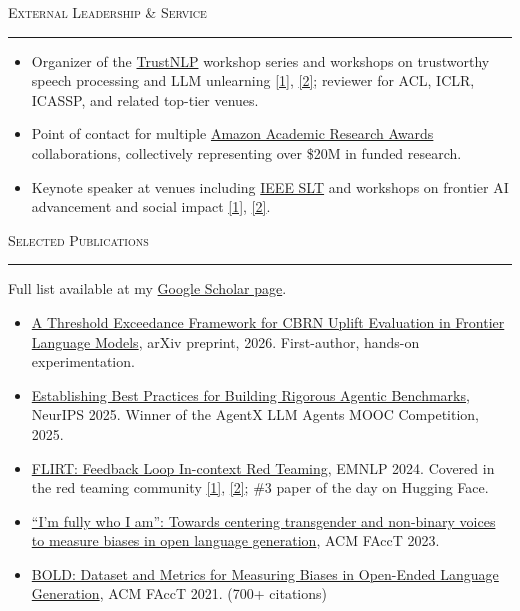 \documentclass[11pt]{article}
\newcommand{\sectionheading}[1]{%
  \vspace{8pt}%
  {\large\scshape #1}\par\vspace{1pt}\hrule\vspace{3pt}%
}
\begin{document}
\sectionheading{External Leadership \& Service}
\begin{itemize}
  \item Organizer of the \href{https://trustnlpworkshop.github.io/}{TrustNLP} workshop series and workshops on trustworthy speech processing and LLM unlearning \href{https://trustworthyspeechprocessing.github.io/}{[1]}, \href{https://llmunlearningsemeval2025.github.io/}{[2]}; reviewer for ACL, ICLR, ICASSP, and related top-tier venues.
  \item Point of contact for multiple \href{https://www.amazon.science/research-awards}{Amazon Academic Research Awards} collaborations, collectively representing over \$20M in funded research.
  \item Keynote speaker at venues including \href{https://signalprocessingsociety.org/newsletter/2026/06/bridging-research-and-innovation-ieee-spoken-language-technology-slt-workshop}{IEEE SLT} and workshops on frontier AI advancement and social impact \href{https://advml-frontier.github.io/}{[1]}, \href{https://nlp4social.github.io/NSG-2026/}{[2]}.
\end{itemize}

\newpage

\sectionheading{Selected Publications}
Full list available at my \href{https://scholar.google.com/citations?user=gSTLsFcAAAAJ}{Google Scholar page}.

\begin{itemize}
  \item \href{https://arxiv.org/abs/2607.12200}{A Threshold Exceedance Framework for CBRN Uplift Evaluation in Frontier Language Models}, arXiv preprint, 2026. {\color{gray}First-author, hands-on experimentation.}
  \item \href{https://arxiv.org/abs/2507.02825}{Establishing Best Practices for Building Rigorous Agentic Benchmarks}, NeurIPS 2025. {\color{gray}Winner of the AgentX LLM Agents MOOC Competition, 2025.}
  \item \href{https://arxiv.org/abs/2308.04265}{FLIRT: Feedback Loop In-context Red Teaming}, EMNLP 2024. {\color{gray}Covered in the red teaming community \href{https://lilianweng.github.io/posts/2023-10-25-adv-attack-llm/}{[1]}, \href{https://huggingface.co/papers/2308.04265}{[2]}; \#3 paper of the day on Hugging Face.}
  \item \href{https://arxiv.org/abs/2305.09941}{``I'm fully who I am'': Towards centering transgender and non-binary voices to measure biases in open language generation}, ACM FAccT 2023.
  \item \href{https://arxiv.org/abs/2101.11718}{BOLD: Dataset and Metrics for Measuring Biases in Open-Ended Language Generation}, ACM FAccT 2021. {\color{gray}(700+ citations)}
\end{itemize}
\end{document}
